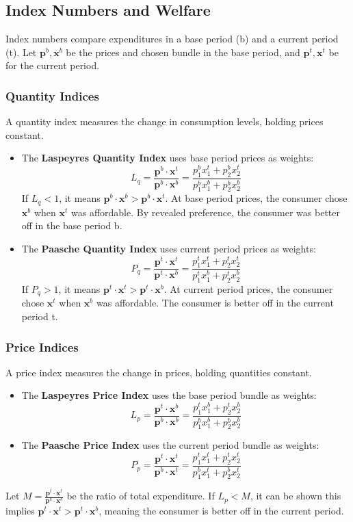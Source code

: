 \subsection{Index Numbers and Welfare}
Index numbers compare expenditures in a base period (b) and a current period (t). Let \(\mathbf{p}^b, \mathbf{x}^b\) be the prices and chosen bundle in the base period, and \(\mathbf{p}^t, \mathbf{x}^t\) be for the current period.

\subsubsection{Quantity Indices}
A quantity index measures the change in consumption levels, holding prices constant.
\begin{itemize}
    \item The \textbf{Laspeyres Quantity Index} uses base period prices as weights:
    \[
    L_q = \frac{\mathbf{p}^b \cdot \mathbf{x}^t}{\mathbf{p}^b \cdot \mathbf{x}^b} = \frac{p_1^b x_1^t + p_2^b x_2^t}{p_1^b x_1^b + p_2^b x_2^b}
    \]
    If \(L_q < 1\), it means \(\mathbf{p}^b \cdot \mathbf{x}^b > \mathbf{p}^b \cdot \mathbf{x}^t\). At base period prices, the consumer chose \(\mathbf{x}^b\) when \(\mathbf{x}^t\) was affordable. By revealed preference, the consumer was better off in the base period b.

    \item The \textbf{Paasche Quantity Index} uses current period prices as weights:
    \[
    P_q = \frac{\mathbf{p}^t \cdot \mathbf{x}^t}{\mathbf{p}^t \cdot \mathbf{x}^b} = \frac{p_1^t x_1^t + p_2^t x_2^t}{p_1^t x_1^b + p_2^t x_2^b}
    \]
    If \(P_q > 1\), it means \(\mathbf{p}^t \cdot \mathbf{x}^t > \mathbf{p}^t \cdot \mathbf{x}^b\). At current period prices, the consumer chose \(\mathbf{x}^t\) when \(\mathbf{x}^b\) was affordable. The consumer is better off in the current period t.
\end{itemize}

\subsubsection{Price Indices}
A price index measures the change in prices, holding quantities constant.
\begin{itemize}
    \item The \textbf{Laspeyres Price Index} uses the base period bundle as weights:
    \[
    L_p = \frac{\mathbf{p}^t \cdot \mathbf{x}^b}{\mathbf{p}^b \cdot \mathbf{x}^b} = \frac{p_1^t x_1^b + p_2^t x_2^b}{p_1^b x_1^b + p_2^b x_2^b}
    \]
    \item The \textbf{Paasche Price Index} uses the current period bundle as weights:
    \[
    P_p = \frac{\mathbf{p}^t \cdot \mathbf{x}^t}{\mathbf{p}^b \cdot \mathbf{x}^t} = \frac{p_1^t x_1^t + p_2^t x_2^t}{p_1^b x_1^t + p_2^b x_2^t}
    \]
\end{itemize}
Let \(M = \frac{\mathbf{p}^t \cdot \mathbf{x}^t}{\mathbf{p}^b \cdot \mathbf{x}^b}\) be the ratio of total expenditure. If \(L_p < M\), it can be shown this implies \(\mathbf{p}^t \cdot \mathbf{x}^t > \mathbf{p}^t \cdot \mathbf{x}^b\), meaning the consumer is better off in the current period.

